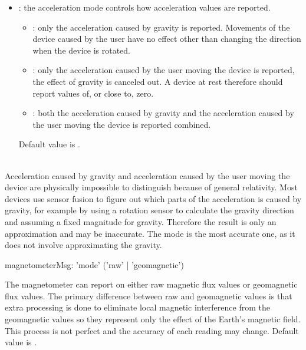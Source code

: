 \begin{itemize}
\item {}: the acceleration mode controls how acceleration values are reported. 
\begin{itemize}
\item {}: only the acceleration caused by gravity is reported. Movements of the device caused by the user have no effect other than changing the direction when the device is rotated. 
\item {}: only the acceleration caused by the user moving the device is reported, the effect of gravity is canceled out. A device at rest therefore should report values of, or close to, zero. 
\item {}: both the acceleration caused by gravity and the acceleration caused by the user moving the device is reported combined. 
\end{itemize}
Default value is .
\end{itemize}

\\
Acceleration caused by gravity and acceleration caused by the user moving the device are physically impossible to distinguish because of general relativity. Most devices use sensor fusion to figure out which parts of the acceleration is caused by gravity, for example by using a rotation sensor to calculate the gravity direction and assuming a fixed magnitude for gravity. Therefore the result is only an approximation and may be inaccurate. The  mode is the most accurate one, as it does not involve approximating the gravity.


\label{Magnetometer}


\begin{rail}
magnetometerMsg: 	'mode' ('raw' | 'geomagnetic')
\end{rail}

The magnetometer can report on either raw magnetic flux values or geomagnetic flux values. 
The primary difference between raw and geomagnetic values is that extra processing is done to eliminate local magnetic interference from the geomagnetic values so they represent only the effect of the Earth's magnetic field. This process is not perfect and the accuracy of each reading may change.
Default value is .


\label{Rotation}

